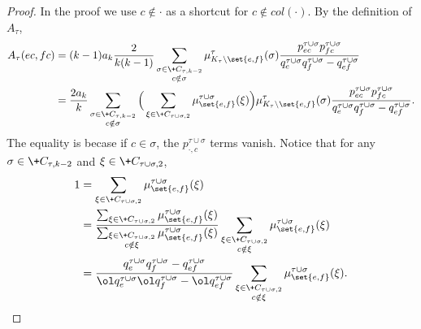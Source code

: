 \documentclass[a4paper,11pt]{article}
\begin{document}
\begin{proof}
    \newcommand{\taur}{\tau\cup\omega|_{K_\tau\setminus\set{e, f}}}
    In the proof we use $c\notin \cdot$ as a shortcut for $c\notin \!{col}(\cdot)$.
    By the definition of $A_\tau$,
    \begin{align*}
        A_\tau(ec, fc)
        &=  (k-1)a_k\frac{2}{k(k-1)}
              \sum_{\substack{\sigma\in \+C_{\tau, k-2}\\ c\notin\sigma}}
              \mu^\tau_{K_\tau\setminus\set{e, f}}(\sigma)
              \frac{p^{\tau\cup\sigma}_{ec}p^{\tau\cup\sigma}_{fc}}
              {q^{\tau\cup\sigma}_{e}q^{\tau\cup\sigma}_f - q^{\tau\cup\sigma}_{ef}}
      \\&=  \frac{2a_k}{k}
              \sum_{\substack{\sigma\in \+C_{\tau, k-2}\\ c\notin\sigma}}
              \Big(
              \sum_{\xi\in \+C_{\tau\cup\sigma, 2}}
              \mu^{\tau\cup\sigma}_{\set{e, f}}(\xi)
              \Big)
              \mu^\tau_{K_\tau\setminus\set{e, f}}(\sigma)
              \frac{p^{\tau\cup\sigma}_{ec}p^{\tau\cup\sigma}_{fc}}
              {q^{\tau\cup\sigma}_{e}q^{\tau\cup\sigma}_f - q^{\tau\cup\sigma}_{ef}}.
    \end{align*}
    The equality is becase if $c\in \sigma$, the $p^{\tau\cup\sigma}_{\cdot, c}$ terms vanish.
    Notice that for any $\sigma\in \+C_{\tau, k-2}$ and $\xi\in\+C_{\tau\cup\sigma, 2}$,
    \begin{align*}
        1 &= 
        \sum_{\xi\in \+C_{\tau\cup\sigma, 2}}
        \mu^{\tau\cup\sigma}_{\set{e, f}}(\xi)
        \\&=
        \frac{
        \sum_{\xi\in \+C_{\tau\cup\sigma, 2}}
        \mu^{\tau\cup\sigma}_{\set{e, f}}(\xi)
        }{
        \sum_{\substack{\xi\in \+C_{\tau\cup\sigma, 2}\\ c\notin \xi}}
        \mu^{\tau\cup\sigma}_{\set{e, f}}(\xi)
        }
        \sum_{\substack{\xi\in \+C_{\tau\cup\sigma, 2} \\ c\notin \xi}}
        \mu^{\tau\cup\sigma}_{\set{e, f}}(\xi)
        \\&=
        \frac{
        {q^{\tau\cup\sigma}_{e}q^{\tau\cup\sigma}_f - q^{\tau\cup\sigma}_{ef}}
        }{
        {\ol q^{\tau\cup\sigma}_{e}\ol q^{\tau\cup\sigma}_f - \ol q^{\tau\cup\sigma}_{ef}}
        }
        \sum_{\substack{\xi\in \+C_{\tau\cup\sigma, 2}\\ c\notin \xi}}
        \mu^{\tau\cup\sigma}_{\set{e, f}}(\xi).
    \end{align*}

\end{proof}
\end{document}
